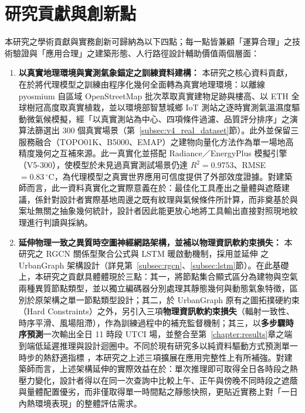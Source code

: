 \section{研究貢獻與創新點}
\label{sec:contributions}

本研究之學術貢獻與實務創新可歸納為以下四點；每一點皆兼顧「運算合理」之技術驗證與「應用合理」之建築形態、人行路徑設計輔助價值兩個層面：

\begin{enumerate}
    \item \textbf{以真實地理環境與實測氣象錨定之訓練資料建構：}
    本研究之核心資料貢獻，在於將代理模型之訓練由程序化幾何全面轉為真實地理環境：以離線 pyosmium 自區域 OpenStreetMap 批次萃取真實建物足跡與樓高、以 ETH 全球樹冠高度取真實植栽，並以環境部智慧城鄉 IoT 測站之逐時實測氣溫濕度驅動微氣候模擬，經「以真實測站為中心、四項條件過濾、品質評分排序」之演算法篩選出 300 個真實場景（第~\ref{subsec:v4_real_dataset}節）。此外並保留三服務融合（TOPO01K、B5000、EMAP）之建物向量化方法作為單一場地高精度幾何之互補來源。此一真實化並搭配 Radiance／EnergyPlus 模擬引擎（V5-300），使模型於未見過真實測試場景仍達 $R^2=0.9753$、RMSE$=0.83\,^\circ\text{C}$，為代理模型之真實世界應用可信度提供了外部效度證據。對建築師而言，此一資料真實化之實際意義在於：最佳化工具產出之量體與遮蔭建議，係針對設計者實際基地周邊之既有紋理與氣候條件所計算，而非奠基於與案址無關之抽象幾何統計，設計者因此能更放心地將工具輸出直接對照現地紋理進行判讀與採納。

    \item \textbf{延伸物理一致之異質時空圖神經網路架構，並補以物理資訊軟約束損失：}
    本研究之 RGCN 關係型聚合公式與 LSTM 暖啟動機制，採用並延伸 \citet{xin2025urbangraph} 之 UrbanGraph 架構設計（詳見第~\ref{subsec:rgcn}、\ref{subsec:lstm}節）。在此基礎上，本研究之貢獻具體體現於三點：其一，將節點集合顯式區分為建物與空氣兩種異質節點類型，並以獨立編碼器分別處理其靜態幾何與動態氣象特徵，區別於原架構之單一節點類型設計；其二，於 UrbanGraph 原有之圖拓撲硬約束（Hard Constraints）之外，另引入三項\textbf{物理資訊軟約束損失}（輻射一致性、時序平滑、風場阻滯），作為訓練過程中的補充監督機制；其三，以\textbf{多步驟時序預測}一次輸出全日 11 時段 UTCI 場，並整合至第~\ref{chapter:results}章之端到端低延遲推理與設計迴圈中。不同於現有研究多以純資料驅動方式預測單一時步的熱舒適指標 \citep{wu2023data}，本研究之上述三項擴展在應用完整性上有所補強。對建築師而言，上述架構延伸的實際效益在於：單次推理即可取得全日各時段之熱壓力變化，設計者得以在同一次查詢中比較上午、正午與傍晚不同時段之遮蔭與量體配置優劣，而非僅取得單一時間點之靜態快照，更貼近實務上對「一日內熱環境表現」的整體評估需求。


\end{enumerate}
